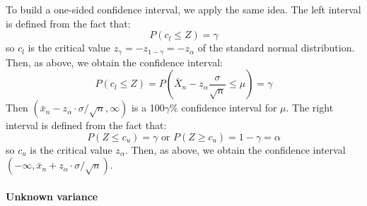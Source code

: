 To build a one-sided confidence interval, we apply the same idea. The left interval is defined from the fact that:
\begin{equation*}
    P(c_l \leq Z) = \gamma
\end{equation*}
so $c_l$ is the critical value $z_{\gamma} = -z_{1-\gamma} = -z_{\alpha}$ of the standard normal distribution. Then, as above, we obtain the confidence interval:
\begin{equation*}
    P(c_l \leq Z) = P(\bar{X}_n - z_{\alpha} \frac{\sigma}{\sqrt{n}} \leq \mu) = \gamma
\end{equation*}
Then $(\bar{x}_n - z_{\alpha}\cdot\sigma/\sqrt{n}, \infty)$ is a 100$\gamma$\% confidence interval for $\mu$. The right interval is defined from the fact that:
\begin{equation*}
    P(Z \leq c_u) = \gamma \text{ or } P(Z \geq c_u) = 1 - \gamma = \alpha
\end{equation*}
so $c_u$ is the critical value $z_{\alpha}$. Then, as above, we obtain the confidence interval $(-\infty, \bar{x}_n + z_{\alpha} \cdot \sigma/\sqrt{n})$.

\paragraph{Unknown variance}

